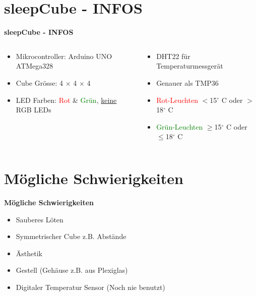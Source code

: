 \documentclass[aspectratio=169]{beamer}
\begin{document}
\section{sleepCube - INFOS} 
\begin{frame}[fragile]
\textbf{sleepCube - INFOS}
\begin{columns}
\begin{column}{0.5\textwidth}
\begin{itemize}
\item Mikrocontroller: Arduino UNO ATMega328
\item Cube Grösse:  4 $\times$ 4 $\times$ 4
\item LED Farben: \textcolor{red}{Rot} \& \textcolor{green}{Grün}, \underline{keine} RGB LEDs

\end{itemize}

\end{column}

\begin{column}{0.5\textwidth}
\begin{itemize}
\item DHT22 für Temperaturmessgerät
\item Genauer als TMP36
\item \textcolor{red}{Rot-Leuchten} $<$15$^{\circ}$ C oder $>$18$^{\circ}$ C
\item \textcolor{green}{Grün-Leuchten} $\geq$15$^{\circ}$ C oder $\leq$18$^{\circ}$ C
\end{itemize}
\end{column}

\end{columns}
\end{frame}

\section{Mögliche Schwierigkeiten} 
\begin{frame}[fragile]
\textbf{Mögliche Schwierigkeiten}
\begin{itemize}
\item Sauberes Löten
\item Symmetrischer Cube z.B. Abstände
\item Ästhetik
\item Gestell (Gehäuse z.B. aus Plexiglas)
\item Digitaler Temperatur Sensor (Noch nie benutzt)
\end{itemize}
\begin{columns}
\begin{column}{0.45\textwidth}


\end{column}
\begin{column}{0.5\textwidth}

\end{column}

\end{columns}
\end{frame}
\end{document}
